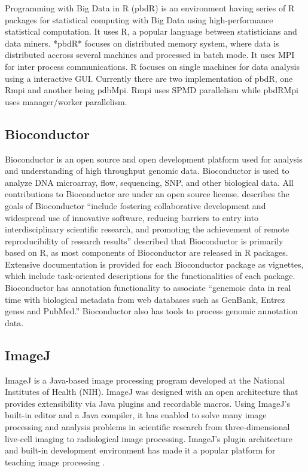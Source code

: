     Programming with Big Data in R (pbdR) \cite{www-pbdR} is an
    environment having series of R packages for statistical computing
    with Big Data using high-performance statistical computation. It
    uses R, a popular language between statisticians and data
    miners. *pbdR* focuses on distributed memory system, where data is
    distributed accross several machines and processed in batch
    mode. It uses MPI for inter process communications. R focuses on
    single machines for data analysis using a interactive
    GUI. Currently there are two implementation of pbdR, one Rmpi and
    another being pdbMpi.  Rmpi uses SPMD parallelism while pbdRMpi
    uses manager/worker parallelism.

\subsection{Bioconductor}

    Bioconductor is an open source and open development platform used
    for analysis and understanding of high throughput genomic
    data. Bioconductor is used to analyze DNA microarray, flow,
    sequencing, SNP, and other biological data. All contributions to
    Bioconductor are under an open source
    license. \cite{bioconductor-article-2004} describes the goals of
    Bioconductor ``include fostering collaborative development and
    widespread use of innovative software, reducing barriers to entry
    into interdisciplinary scientific research, and promoting the
    achievement of remote reproducibility of research results''
    \cite{www-bioconductor-about} described that Bioconductor is
    primarily based on R, as most components of Bioconductor are
    released in R packages. Extensive documentation is provided for
    each Bioconductor package as vignettes, which include
    task-oriented descriptions for the functionalities of each
    package. Bioconductor has annotation functionality to associate
    ``genemoic data in real time with biological metadata from web
    databases such as GenBank, Entrez genes and PubMed.''  Bioconductor
    also has tools to process genomic annotation data.
    
\subsection{ImageJ}

    ImageJ is a Java-based image processing program developed at the
    National Institutes of Health (NIH). ImageJ was designed with an
    open architecture that provides extensibility via Java plugins and
    recordable macros.  Using ImageJ's built-in editor and a Java
    compiler, it has enabled to solve many image processing and
    analysis problems in scientific research from three-dimensional
    live-cell imaging to radiological image processing.  ImageJ's
    plugin architecture and built-in development environment has made
    it a popular platform for teaching image
    processing \cite{www-imagej}.

